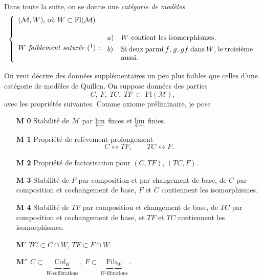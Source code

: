 \documentclass[11pt]{article}
\newcommand{\printedpage}[1]{\marginpar{\footnotesize p.~#1}}
\newcommand{\msp}[1]{\marginpar{\footnotesize [#1]}}
\newcommand{\Fl}{\mathrm{Fl}}
\newcommand{\cM}{\mathcal{M}}
\newcommand{\Cof}{\mathrm{Cof}}
\newcommand{\Fib}{\mathrm{Fib}}
\begin{document}
Dans toute la suite, on se donne une \textit{catégorie de modèles}
\[
\left\{
\begin{array}{ll}
\mbox{$(\cM,W)$, où $W\subset\Fl(\cM)$} & \\[3ex]
\mbox{\textit{$W$ faiblement saturée} (\footnotemark) :} &
\begin{array}[c]{@{}l@{\quad}p{6.5cm}@{}}
a) & $W$ contient les isomorphismes.\\[1ex]
b) & Si deux parmi $f$, $g$, $gf$ dans $W$, le troisième aussi.
\end{array}
\end{array}
\right.
\]

\printedpage{5}
On veut décrire des données supplémentaires un peu plus faibles que celles d'une catégorie de modèles de Quillen. On suppose données des parties
\[
C,\ F,\ TC,\ TF\ \subset\ \Fl(\cM),
\]
avec les propriétés suivantes. Comme axiome préliminaire, je pose

\begin{itemize}[leftmargin=3em,labelsep=0.6em]
\item[\textbf{M 0}] Stabilité de $\cM$ par $\varprojlim$ finies et $\varprojlim$ finies.

\item[\textbf{M 1}]\msp{page 8}Propriété de relèvement-prolongement
\[
C\longleftrightarrow TF,\qquad TC\longleftrightarrow F.
\]

\item[\textbf{M 2}] Propriété de factorisation pour $(C,TF)$, $(TC,F)$.

\item[\textbf{M 3}] Stabilité de $F$ par composition et par changement de base, de $C$ par composition et cochangement de base, $F$ et $C$ contiennent les isomorphismes.

\item[\textbf{M 4}] Stabilité de $TF$ par composition et changement de base, de $TC$ par composition et cochangement de base, et $TF$ et $TC$ contiennent les isomorphismes.

\item[\textbf{M}$'$] $TC\subset C\cap W$, $TF\subset F\cap W$.

\item[\textbf{M}$''$] $C\subset\ \underbrace{\Cof_W}_{\text{$W$-cofibrations}}\ ,\ F\subset\ \underbrace{\Fib_W}_{\text{$W$-fibrations}}\ .$
\end{itemize}
\end{document}
